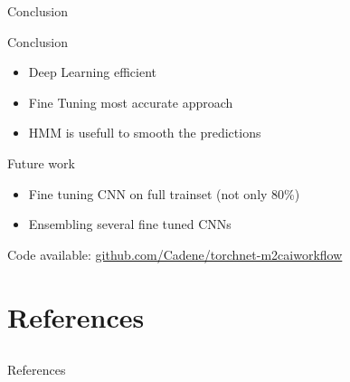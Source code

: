 \begin{frame}{Conclusion}

	\begin{block}{Conclusion}
		\begin{itemize}
			\item Deep Learning efficient %
			\item Fine Tuning most accurate approach %
			\item HMM is usefull to smooth the predictions %
		\end{itemize}
	\end{block}
	
	\begin{block}{Future work}
		\begin{itemize}
			\item Fine tuning CNN on full trainset (not only 80\%)
			\item Ensembling several fine tuned CNNs
		\end{itemize}
	\end{block}
	
	Code available: \url{github.com/Cadene/torchnet-m2caiworkflow}
	
\end{frame}

\section{References} \subsection{}\label{references}

\begin{frame}[allowframebreaks]{References}
	
	\printbibliography[heading=none]
	
\end{frame}